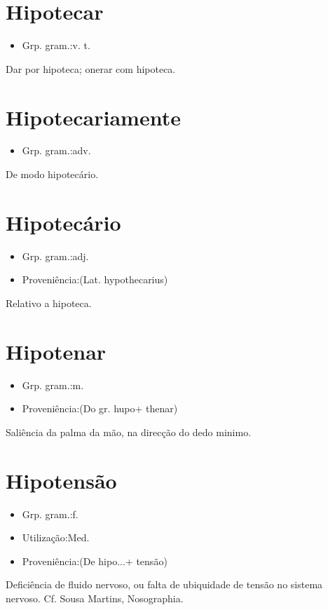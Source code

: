 \documentclass{article}
\begin{document}
\section{Hipotecar}
\begin{itemize}
\item {Grp. gram.:v. t.}
\end{itemize}
Dar por hipoteca; onerar com hipoteca.
\section{Hipotecariamente}
\begin{itemize}
\item {Grp. gram.:adv.}
\end{itemize}
De modo hipotecário.
\section{Hipotecário}
\begin{itemize}
\item {Grp. gram.:adj.}
\end{itemize}
\begin{itemize}
\item {Proveniência:(Lat. \textunderscore hypothecarius\textunderscore )}
\end{itemize}
Relativo a hipoteca.
\section{Hipotenar}
\begin{itemize}
\item {Grp. gram.:m.}
\end{itemize}
\begin{itemize}
\item {Proveniência:(Do gr. \textunderscore hupo\textunderscore  + \textunderscore thenar\textunderscore )}
\end{itemize}
Saliência da palma da mão, na direcção do dedo minimo.
\section{Hipotensão}
\begin{itemize}
\item {Grp. gram.:f.}
\end{itemize}
\begin{itemize}
\item {Utilização:Med.}
\end{itemize}
\begin{itemize}
\item {Proveniência:(De \textunderscore hipo...\textunderscore  + \textunderscore tensão\textunderscore )}
\end{itemize}
Deficiência de fluido nervoso, ou falta de ubiquidade de tensão no sistema nervoso. Cf. Sousa Martins, \textunderscore Nosographia\textunderscore .
\end{document}
